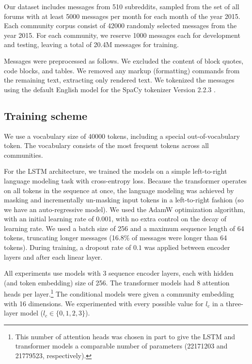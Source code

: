 \documentclass[11pt]{article}
\newcommand\jp[1]{\todo[backgroundcolor=blue!10]{JP: #1}}
\begin{document}
Our dataset includes messages from \num{510} subreddits, 
sampled\jp{what is the size of the whole population? why 510?} from the set of all forums 
with at least \num{5000} messages per month for each month
of the year 2015.
Each community corpus consist of \num{42000} randomly selected messages from the year 2015.
For each community, we reserve \num{1000} messages each for development and testing,
leaving a total of \num{20.4}M messages for training.

Messages were preprocessed as follows. 
We excluded the content of block quotes, code blocks, and tables.
We removed any markup (formatting) commands from the remaining text, 
extracting only rendered text.
We tokenized the messages using the default English model for the SpaCy tokenizer 
Version 2.2.3 \citep{Honnibal2017}.


\subsection{Training scheme}

We use a vocabulary size of \num{40000} tokens, including a special
out-of-vocabulary token.  The vocabulary consists of the most frequent
tokens across all communities.

For the LSTM architecture, we trained the models on a simple left-to-right language
modeling task with cross-entropy loss.  Because
the transformer operates on all tokens in the sequence at once, the
language modeling was achieved by masking and incrementally un-masking
input tokens in a left-to-right fashion (so we have an
auto-regressive model).  We used the AdamW
\citep{Loshchilov2019} optimization algorithm, with an initial
learning rate of \num{0.001}, with no extra control on the decay
of learning rate.
%
We used a batch size of \num{256} and a maximum sequence length of
\num{64} tokens, truncating longer messages (16.8\% of messages were
longer than \num{64} tokens).  During training, a dropout rate of
$0.1$ was applied between encoder layers and after each linear layer.

All experiments use models with \num{3} sequence encoder layers,
each with hidden (and token embedding) size of \num{256}. 
The transformer models had \num{8} attention heads per layer.\footnote{
  This number of attention heads was chosen in part to give the LSTM and transformer
  models a comparable number of parameters 
  (\num{22171203} and \num{21779523}, respectively).}
The conditional models were given a community embedding with \num{16} dimensions. 
We experimented with every possible value for $l_c$ in a three-layer model ($l_c\in\{0,1,2,3\}$).
\end{document}
